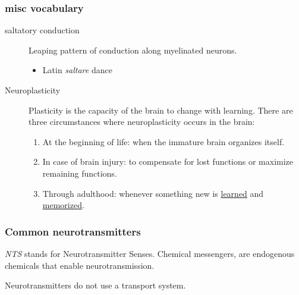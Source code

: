 \documentclass[11pt]{article}
\begin{document}
\subsubsection{misc vocabulary}
\label{sec:org08c5946}
\begin{description}
\item[{saltatory conduction}] Leaping pattern of conduction along myelinated
neurons.
\begin{itemize}
\item Latin \emph{saltare} dance
\end{itemize}
\item[{Neuroplasticity}] Plasticity is the capacity of the brain to change with
learning. There are three circumstances where neuroplasticity occurs in
the brain:
\begin{enumerate}
\item At the beginning of life: when the immature brain organizes itself.
\item In case of brain injury: to compensate for lost functions or maximize
remaining functions.
\item Through adulthood: whenever something new is \uline{learned} and \uline{memorized}.
\end{enumerate}
\end{description}

\subsubsection{Common neurotransmitters}
\label{sec:orgaa34f73}
\emph{NTS} stands for Neurotransmitter Senses. Chemical messengers, are
endogenous chemicals that enable neurotransmission. 

Neurotransmitters do not use a transport system.
\end{document}

